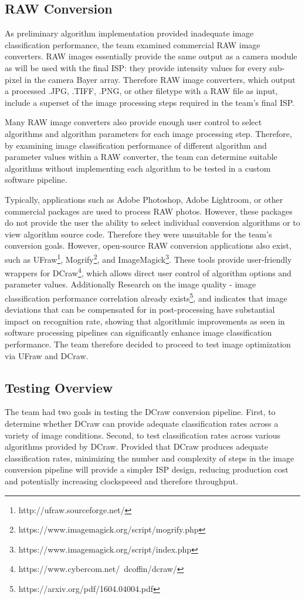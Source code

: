 \documentclass{report}
\begin{document}
\subsection{RAW Conversion}
As preliminary algorithm implementation provided inadequate image classification performance, the team examined commercial RAW image converters. RAW images essentially provide the same output as a camera module as will be used with the final ISP: they provide intensity values for every sub-pixel in the camera Bayer array. Therefore RAW image converters, which output a processed .JPG, .TIFF, .PNG, or other filetype with a RAW file as input, include a superset of the image processing steps required in the team's final ISP. 

Many RAW image converters also provide enough user control to select algorithms and algorithm parameters for each image processing step. Therefore, by examining image classification performance of different algorithm and parameter values within a RAW converter, the team can determine suitable algorithms without implementing each algorithm to be tested in a custom software pipeline.

Typically, applications such as Adobe Photoshop, Adobe Lightroom, or other commercial packages are used to process RAW photos. However, these packages do not provide the user the ability to select individual conversion algorithms or to view algorithm source code. Therefore they were unsuitable for the team's conversion goals. However, open-source RAW conversion applications also exist, such as UFraw\footnote{http://ufraw.sourceforge.net/}, Mogrify\footnote{https://www.imagemagick.org/script/mogrify.php}, and ImageMagick\footnote{https://www.imagemagick.org/script/index.php}. These tools provide user-friendly wrappers for DCraw\footnote{https://www.cybercom.net/~dcoffin/dcraw/}, which allows direct user control of algorithm options and parameter values. Additionally Research on the image quality - image classification performance correlation already exists\footnote{https://arxiv.org/pdf/1604.04004.pdf}, and indicates that image deviations that can be compensated for in post-processing have substantial impact on recognition rate, showing that algorithmic improvements as seen in software processing pipelines can significantly enhance image classification performance. The team therefore decided to proceed to test image optimization via UFraw and DCraw.

\subsection{Testing Overview}
The team had two goals in testing the DCraw conversion pipeline. First, to determine whether DCraw can provide adequate classification rates across a variety of image conditions. Second, to test classification rates across various algorithms provided by DCraw. Provided that DCraw produces adequate classification rates, minimizing the number and complexity of steps in the image conversion pipeline will provide a simpler ISP design, reducing production cost and potentially increasing clockspeeed and therefore throughput.
\end{document}

